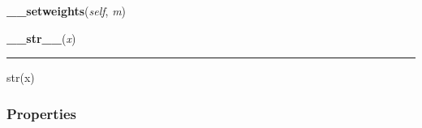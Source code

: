     \vspace{0.5ex}

    \begin{boxedminipage}{\textwidth}

    \raggedright \textbf{\_\_setweights}(\textit{self}, \textit{m})

    \end{boxedminipage}

    \label{object:__str__}

    \vspace{0.5ex}

    \begin{boxedminipage}{\textwidth}

    \raggedright \textbf{\_\_str\_\_}(\textit{x})

    \vspace{-1.5ex}

    \rule{\textwidth}{0.5\fboxrule}

str(x)
    \vspace{1ex}

    \end{boxedminipage}



  \subsubsection{Properties}

